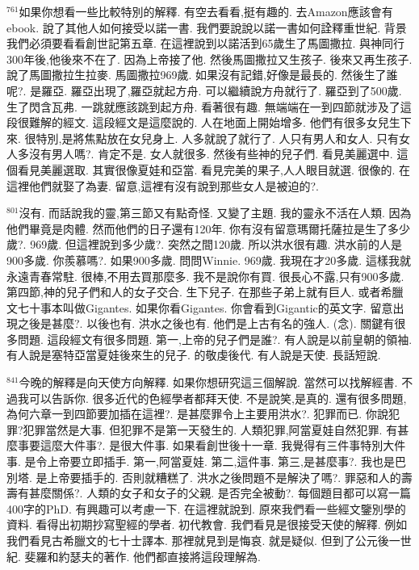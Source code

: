\documentclass{book}
\begin{document}
$^{761}$如果你想看一些比較特別的解釋.
有空去看看,挺有趣的.
去Amazon應該會有ebook.
說了其他人如何接受以諾一書.
我們要說說以諾一書如何詮釋重世紀.
背景我們必須要看看創世記第五章.
在這裡說到以諾活到65歲生了馬圖撒拉.
與神同行300年後,他後來不在了.
因為上帝接了他.
然後馬圖撒拉又生孩子.
後來又再生孩子.
說了馬圖撒拉生拉麥.
馬圖撒拉969歲.
如果沒有記錯,好像是最長的.
然後生了誰呢?.
是羅亞.
羅亞出現了,羅亞就起方舟.
可以繼續說方舟就行了.
羅亞到了500歲.
生了閃含瓦弗.
一跳就應該跳到起方舟.
看著很有趣.
無端端在一到四節就涉及了這段很難解的經文.
這段經文是這麼說的.
人在地面上開始增多.
他們有很多女兒生下來.
很特別,是將焦點放在女兒身上.
人多就說了就行了.
人只有男人和女人.
只有女人多沒有男人嗎?.
肯定不是.
女人就很多.
然後有些神的兒子們.
看見美麗選中.
這個看見美麗選取.
其實很像夏娃和亞當.
看見完美的果子,人人眼目就選.
很像的.
在這裡他們就娶了為妻.
留意,這裡有沒有說到那些女人是被迫的?.

$^{801}$沒有.
而話說我的靈,第三節又有點奇怪.
又變了主題.
我的靈永不活在人類.
因為他們畢竟是肉體.
然而他們的日子還有120年.
你有沒有留意瑪爾托薩拉是生了多少歲?.
969歲.
但這裡說到多少歲?.
突然之間120歲.
所以洪水很有趣.
洪水前的人是900多歲.
你羨慕嗎?.
如果900多歲.
問問Winnie.
969歲.
我現在才20多歲.
這樣我就永遠青春常駐.
很棒,不用去買那麼多.
我不是說你有買.
很長心不露,只有900多歲.
第四節,神的兒子們和人的女子交合.
生下兒子.
在那些子弟上就有巨人.
或者希臘文七十事本叫做Gigantes.
如果你看Gigantes.
你會看到Gigantic的英文字.
留意出現之後是甚麼?.
以後也有.
洪水之後也有.
他們是上古有名的強人.
(念).
關鍵有很多問題.
這段經文有很多問題.
第一,上帝的兒子們是誰?.
有人說是以前皇朝的領袖.
有人說是塞特亞當夏娃後來生的兒子.
的敬虔後代.
有人說是天使.
長話短說.

$^{841}$今晚的解釋是向天使方向解釋.
如果你想研究這三個解說.
當然可以找解經書.
不過我可以告訴你.
很多近代的色經學者都拜天使.
不是說笑,是真的.
還有很多問題,為何六章一到四節要加插在這裡?.
是甚麼罪令上主要用洪水?.
犯罪而已.
你說犯罪?犯罪當然是大事.
但犯罪不是第一天發生的.
人類犯罪,阿當夏娃自然犯罪.
有甚麼事要這麼大件事?.
是很大件事.
如果看創世後十一章.
我覺得有三件事特別大件事.
是令上帝要立即插手.
第一,阿當夏娃.
第二,這件事.
第三,是甚麼事?.
我也是巴別塔.
是上帝要插手的.
否則就糟糕了.
洪水之後問題不是解決了嗎?.
罪惡和人的壽壽有甚麼關係?.
人類的女子和女子的父親.
是否完全被動?.
每個題目都可以寫一篇400字的PhD.
有興趣可以考慮一下.
在這裡就說到.
原來我們看一些經文鑒別學的資料.
看得出初期抄寫聖經的學者.
初代教會.
我們看見是很接受天使的解釋.
例如我們看見古希臘文的七十士譯本.
那裡就見到是悔哀.
就是疑似.
但到了公元後一世紀.
斐羅和約瑟夫的著作.
他們都直接將這段理解為.
\end{document}
